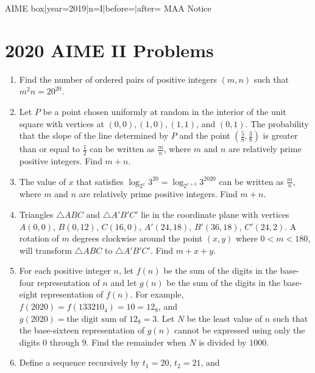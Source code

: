 \documentclass{article}
\begin{document}
\begin{enumerate}[label=\arabic*., itemsep=0.5em]
{{AIME box|year=2019|n=I|before=|after=}}
{{MAA Notice}}\par \vspace{0.5em}\end{enumerate}\newpage\section*{2020 AIME II Problems}
\begin{enumerate}[label=\arabic*., itemsep=0.5em]\item Find the number of ordered pairs of positive integers \((m,n)\) such that \({m^2n = 20 ^{20}}\).\par \vspace{0.5em}\item Let \(P\) be a point chosen uniformly at random in the interior of the unit square with vertices at \((0,0), (1,0), (1,1)\), and \((0,1)\). The probability that the slope of the line determined by \(P\) and the point \(\left(\frac58, \frac38 \right)\) is greater than or equal to \(\frac12\) can be written as \(\frac{m}{n}\), where \(m\) and \(n\) are relatively prime positive integers. Find \(m+n\).\par \vspace{0.5em}\item The value of \(x\) that satisfies \(\log_{2^x} 3^{20} = \log_{2^{x+3}} 3^{2020}\) can be written as \(\frac{m}{n}\), where \(m\) and \(n\) are relatively prime positive integers. Find \(m+n\).\par \vspace{0.5em}\item Triangles \(\triangle ABC\) and \(\triangle A'B'C'\) lie in the coordinate plane with vertices \(A(0,0)\), \(B(0,12)\), \(C(16,0)\), \(A'(24,18)\), \(B'(36,18)\), \(C'(24,2)\). A rotation of \(m\) degrees clockwise around the point \((x,y)\) where \(0<m<180\), will transform \(\triangle ABC\) to \(\triangle A'B'C'\). Find \(m+x+y\).\par \vspace{0.5em}\item For each positive integer \(n\), let \(f(n)\) be the sum of the digits in the base-four representation of \(n\) and let \(g(n)\) be the sum of the digits in the base-eight representation of \(f(n)\). For example, \(f(2020) = f(133210_{\text{4}}) = 10 = 12_{\text{8}}\), and \(g(2020) = \text{the digit sum of }12_{\text{8}} = 3\). Let \(N\) be the least value of \(n\) such that the base-sixteen representation of \(g(n)\) cannot be expressed using only the digits \(0\) through \(9\). Find the remainder when \(N\) is divided by \(1000\).\par \vspace{0.5em}\item Define a sequence recursively by \(t_1 = 20\), \(t_2 = 21\), and

\end{enumerate}
\end{document}
